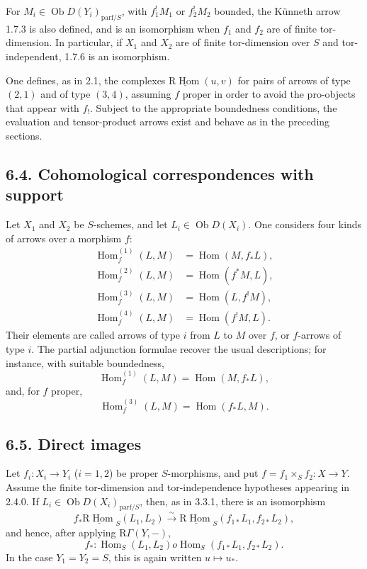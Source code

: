 \documentclass[11pt]{article}
\theoremstyle{plain}
\theoremstyle{definition}
\theoremstyle{remark}
\DeclareMathOperator{\Hom}{Hom}
\DeclareMathOperator{\ob}{Ob}
\newcommand{\R}{\mathrm R}
\begin{document}
For $M_i\in\ob D(Y_i)_{\mathrm{parf}/S}$, with $f_1^!M_1$ or $f_2^!M_2$ bounded, the Künneth arrow 1.7.3 is also defined, and is an isomorphism when $f_1$ and $f_2$ are of finite tor-dimension. In particular, if $X_1$ and $X_2$ are of finite tor-dimension over $S$ and tor-independent, 1.7.6 is an isomorphism.

One defines, as in 2.1, the complexes $\underline{\R\Hom}(u,v)$ for pairs of arrows of type $(2,1)$ and of type $(3,4)$, assuming $f$ proper in order to avoid the pro-objects that appear with $f_!$. Subject to the appropriate boundedness conditions, the evaluation and tensor-product arrows exist and behave as in the preceding sections.

\subsection*{6.4. Cohomological correspondences with support}
Let $X_1$ and $X_2$ be $S$-schemes, and let $L_i\in\ob D(X_i)$. One considers four kinds of arrows over a morphism $f$:
\begin{align}
   \Hom_f^{(1)}(L,M)&=\Hom(M,f_*L),       \tag{6.4.1}\\
   \Hom_f^{(2)}(L,M)&=\Hom(f^*M,L),       \tag{6.4.2}\\
   \Hom_f^{(3)}(L,M)&=\Hom(L,f^!M),       \tag{6.4.3}\\
   \Hom_f^{(4)}(L,M)&=\Hom(f^!M,L).       \tag{6.4.4}
\end{align}
Their elements are called arrows of type $i$ from $L$ to $M$ over $f$, or $f$-arrows of type $i$. The partial adjunction formulae recover the usual descriptions; for instance, with suitable boundedness,
\[
   \Hom_f^{(1)}(L,M)=\Hom(M,f_*L),
\]
and, for $f$ proper,
\[
   \Hom_f^{(3)}(L,M)=\Hom(f_*L,M).
\]

\subsection*{6.5. Direct images}
Let $f_i:X_i\to Y_i$ ($i=1,2$) be proper $S$-morphisms, and put $f=f_1\times_S f_2:X\to Y$. Assume the finite tor-dimension and tor-independence hypotheses appearing in 2.4.0. If $L_i\in\ob D(X_i)_{\mathrm{parf}/S}$, then, as in 3.3.1, there is an isomorphism
\begin{equation}
   f_*\underline{\R\Hom}_S(L_1,L_2)
      \xrightarrow{\sim}
   \underline{\R\Hom}_S(f_{1*}L_1,f_{2*}L_2),
   \tag{6.5.1}
\end{equation}
and hence, after applying $\R\Gamma(Y,-)$,
\begin{equation}
   f_*:\Hom_S(L_1,L_2)	o \Hom_S(f_{1*}L_1,f_{2*}L_2).
   \tag{6.5.2}
\end{equation}
In the case $Y_1=Y_2=S$, this is again written $u\mapsto u_*$.
\end{document}
